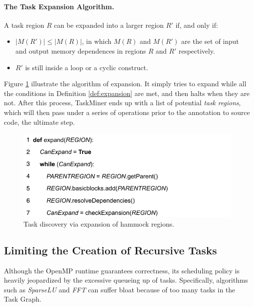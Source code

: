 \documentclass[sigplan,10pt,review,anonymous]{acmart}
\newcommand\Taskminer{\mbox{\textsf{TaskMiner}}}
\begin{document}
\paragraph{The Task Expansion Algorithm.}

\begin{definition}
\label{def:expansion}
A task region $R$ can be expanded into a larger region $R'$ if, and only if:
\begin{itemize}
\item $|M(R')| \leq |M(R)|$, in which $M(R)$ and $M(R')$ are the set of input and output memory
dependences in regions $R$ and $R'$ respectively.
\item $R'$ is still inside a loop or a cyclic construct.
\end{itemize}
\end{definition}

Figure \ref{fig:expand_alg} illustrate the algorithm of expansion. It simply tries to expand while
all the conditions in Definition \ref{def:expansion} are met, and then halts
when they are not. After this process, {\Taskminer} ends up with a list
of potential \emph{task regions}, which will then pass under
a series of operations prior to the annotation to source code, the 
ultimate step.

\begin{figure}[h]
\begin{center}
\includegraphics[width=1\columnwidth]{images/expand_alg}
\caption{Task discovery via expansion of hammock regions.}
\label{fig:expand_alg}
\end{center}
\end{figure}

\subsection{Limiting the Creation of Recursive Tasks}
\label{sub:rec}

Although the OpenMP runtime guarantees correctness, its scheduling policy
is heavily jeopardized by the excessive queueing up of tasks. Specifically, algorithms
such as \emph{SparseLU} and \emph{FFT} can suffer bloat because of
too many tasks in the Task Graph\cite{Huynh17}.
\end{document}
